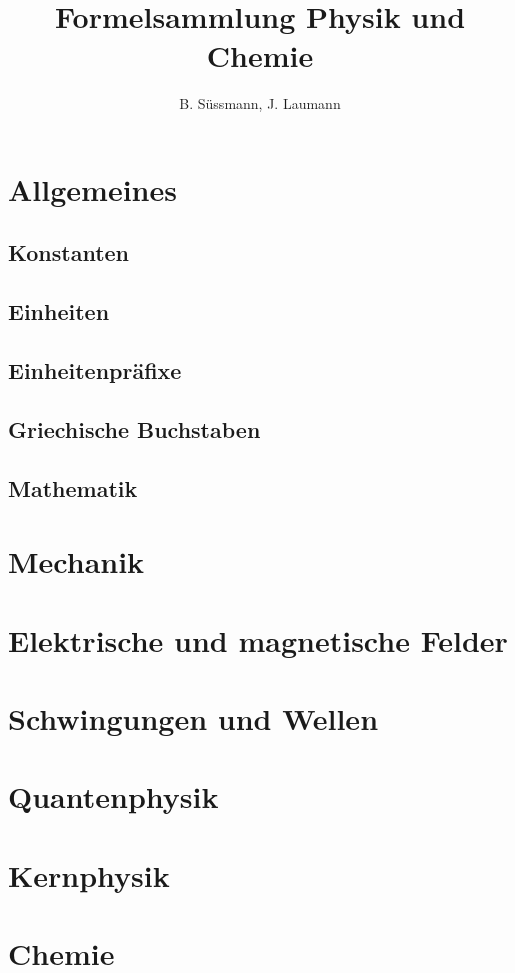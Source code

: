 \documentclass[10pt,twocolumn,twoside,BCOR=10mm,DIV=calc,headings=small,parskip=half]{scrartcl}
\title{Formelsammlung Physik und Chemie}
\author{B. Süssmann,  J. Laumann}
\numberwithin{equation}{section}
\begin{document}
\thispagestyle{firstpage}

\section{Allgemeines}
\subsection{Konstanten}

 
\subsection{Einheiten}

 
\subsection{Einheitenpräfixe}

 
\subsection{Griechische Buchstaben}


\subsection{Mathematik}

 
\section{Mechanik}

 
\section{Elektrische und magnetische Felder}

 
\section{Schwingungen und Wellen}


 
\section{Quantenphysik}

 
\section{Kernphysik}


\section{Chemie}

 
\end{document}
